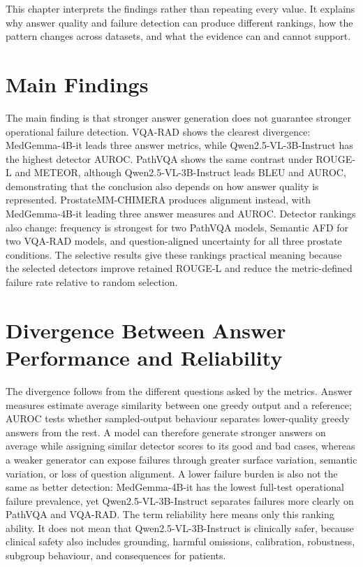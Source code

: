 This chapter interprets the findings rather than repeating every value. It explains why answer quality and failure detection can produce different rankings, how the pattern changes across datasets, and what the evidence can and cannot support.

\section{Main Findings}

The main finding is that stronger answer generation does not guarantee stronger operational failure detection. VQA-RAD shows the clearest divergence: MedGemma-4B-it leads three answer metrics, while Qwen2.5-VL-3B-Instruct has the highest detector AUROC. PathVQA shows the same contrast under ROUGE-L and METEOR, although Qwen2.5-VL-3B-Instruct leads BLEU and AUROC, demonstrating that the conclusion also depends on how answer quality is represented. ProstateMM-CHIMERA produces alignment instead, with MedGemma-4B-it leading three answer measures and AUROC. Detector rankings also change: frequency is strongest for two PathVQA models, Semantic AFD for two VQA-RAD models, and question-aligned uncertainty for all three prostate conditions. The selective results give these rankings practical meaning because the selected detectors improve retained ROUGE-L and reduce the metric-defined failure rate relative to random selection.

\section{Divergence Between Answer Performance and Reliability}

The divergence follows from the different questions asked by the metrics. Answer measures estimate average similarity between one greedy output and a reference; AUROC tests whether sampled-output behaviour separates lower-quality greedy answers from the rest. A model can therefore generate stronger answers on average while assigning similar detector scores to its good and bad cases, whereas a weaker generator can expose failures through greater surface variation, semantic variation, or loss of question alignment. A lower failure burden is also not the same as better detection: MedGemma-4B-it has the lowest full-test operational failure prevalence, yet Qwen2.5-VL-3B-Instruct separates failures more clearly on PathVQA and VQA-RAD. The term reliability here means only this ranking ability. It does not mean that Qwen2.5-VL-3B-Instruct is clinically safer, because clinical safety also includes grounding, harmful omissions, calibration, robustness, subgroup behaviour, and consequences for patients.

